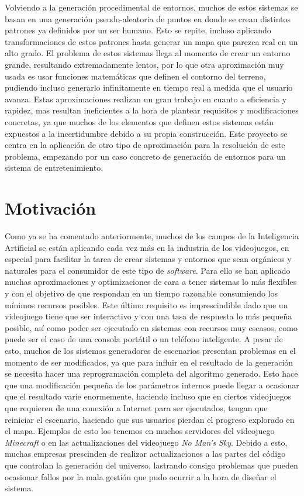 Volviendo a la generación procedimental de entornos, muchos de estos sistemas se basan en una generación pseudo-aleatoria de puntos en donde se crean distintos patrones ya definidos por un ser humano. Esto se repite, incluso aplicando transformaciones de estos patrones hasta generar un mapa que parezca real en un alto grado. El problema de estos sistemas llega al momento de crear un entorno grande, resultando extremadamente lentos, por lo que otra aproximación muy usada es usar funciones matemáticas que definen el contorno del terreno, pudiendo incluso generarlo infinitamente en tiempo real a medida que el usuario avanza. Estas aproximaciones realizan un gran trabajo en cuanto a eficiencia y rapidez, mas resultan ineficientes a la hora de plantear requisitos y modificaciones concretas, ya que muchos de los elementos que definen estos sistemas están expuestos a la incertidumbre debido a su propia construcción. Este proyecto se centra en la aplicación de otro tipo de aproximación para la resolución de este problema, empezando por un caso concreto de generación de entornos para un sistema de entretenimiento.

\section{Motivación}

Como ya se ha comentado anteriormente, muchos de los campos de la Inteligencia Artificial se están aplicando cada vez más en la industria de los videojuegos, en especial para facilitar la tarea de crear sistemas y entornos que sean orgánicos y naturales para el consumidor de este tipo de \textit{software}. Para ello se han aplicado muchas aproximaciones y optimizaciones de cara a tener sistemas lo más flexibles y con el objetivo de que respondan en un tiempo razonable consumiendo los mínimos recursos posibles. Este último requisito es imprescindible dado que un videojuego tiene que ser interactivo y con una tasa de respuesta lo más pequeña posible, así como poder ser ejecutado en sistemas con recursos muy escasos, como puede ser el caso de una consola portátil o un teléfono inteligente. A pesar de esto, muchos de los sistemas generadores de escenarios presentan problemas en el momento de ser modificados, ya que para influir en el resultado de la generación se necesita hacer una reprogramación completa del algoritmo generado. Esto hace que una modificación pequeña de los parámetros internos puede llegar a ocasionar que el resultado varíe enormemente, haciendo incluso que en ciertos videojuegos que requieren de una conexión a Internet para ser ejecutados, tengan que reiniciar el escenario, haciendo que sus usuarios pierdan el progreso explorado en el mapa. Ejemplos de esto los tenemos en muchos servidores del videojuego \textit{Minecraft} o en las actualizaciones del videojuego \textit{No Man's Sky}. Debido a esto, muchas empresas prescinden de realizar actualizaciones a las partes del código que controlan la generación del universo, lastrando consigo problemas que pueden ocasionar fallos por la mala gestión que pudo ocurrir a la hora de diseñar el sistema. \\

